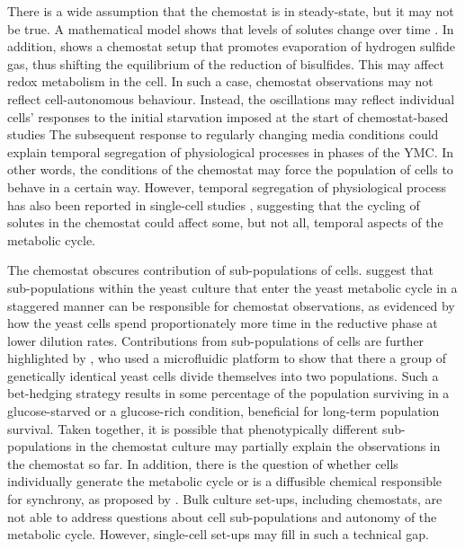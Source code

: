 There is a wide assumption that the chemostat is in steady-state, but it may not be true.
A mathematical model shows that levels of solutes change over time \citep{jonesCyberneticModelGrowth1999}.
In addition, \citet{oneillEukaryoticCellBiology2020} shows a chemostat setup that promotes evaporation of hydrogen sulfide gas, thus shifting the equilibrium of the reduction of bisulfides.
This may affect redox metabolism in the cell.
In such a case, chemostat observations may not reflect cell-autonomous behaviour.
Instead, the oscillations may reflect individual cells' responses to the initial starvation imposed at the start of chemostat-based studies
The subsequent response to regularly changing media conditions could explain temporal segregation of physiological processes in phases of the YMC.
In other words, the conditions of the chemostat may force the population of cells to behave in a certain way.
However, temporal segregation of physiological process has also been reported in single-cell studies \citep{takhaveevTemporalSegregationBiosynthetic2023}, suggesting that the cycling of solutes in the chemostat could affect some, but not all, temporal aspects of the metabolic cycle.

The chemostat obscures contribution of sub-populations of cells.
\citet{burnettiCellCycleStart2016} suggest that sub-populations within the yeast culture that enter the yeast metabolic cycle in a staggered manner can be responsible for chemostat observations, as evidenced by how the yeast cells spend proportionately more time in the reductive phase at lower dilution rates.
Contributions from sub-populations of cells are further highlighted by \citet{bagameryPutativeBetHedgingStrategy2020}, who used a microfluidic platform to show that there a group of genetically identical yeast cells divide themselves into two populations.
Such a bet-hedging strategy results in some percentage of the population surviving in a glucose-starved or a glucose-rich condition, beneficial for long-term population survival.
Taken together, it is possible that phenotypically different sub-populations in the chemostat culture may partially explain the observations in the chemostat so far.
In addition, there is the question of whether cells individually generate the metabolic cycle or is a diffusible chemical responsible for synchrony, as proposed by \citet{krishnaMinimalPushPull2018}.
Bulk culture set-ups, including chemostats, are not able to address questions about cell sub-populations and autonomy of the metabolic cycle.
However, single-cell set-ups may fill in such a technical gap.

